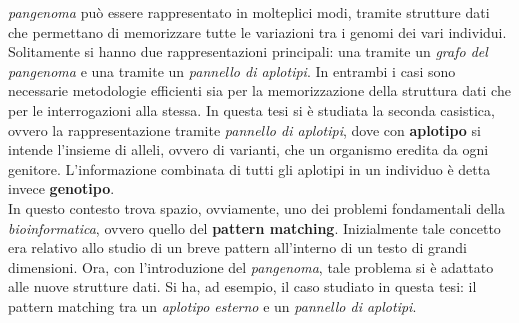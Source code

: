 \documentclass[a4paper,11pt, oneside]{article}
\begin{document}
\textit{pangenoma} può essere rappresentato in molteplici modi, tramite
strutture dati che permettano di memorizzare tutte le variazioni tra i genomi
dei vari individui. Solitamente si hanno due rappresentazioni principali: una
tramite un \textit{grafo del pangenoma} e una tramite un \textit{pannello di
  aplotipi}. In entrambi i casi sono necessarie metodologie efficienti sia per
la memorizzazione della struttura dati che per le interrogazioni alla stessa. In
questa tesi si è studiata la seconda casistica, ovvero la rappresentazione
tramite \textit{pannello di aplotipi}, dove con \textbf{aplotipo} si intende
l'insieme di alleli, ovvero di varianti, che un organismo eredita da ogni
genitore. L'informazione combinata di tutti gli aplotipi in un individuo è detta
invece \textbf{genotipo}.\\
In questo contesto trova spazio, ovviamente, uno dei problemi fondamentali
della \textit{bioinformatica}, ovvero quello del \textbf{pattern
  matching}. Inizialmente tale concetto era relativo allo studio di un breve
pattern all'interno di un testo di grandi dimensioni. Ora, con l'introduzione
del \textit{pangenoma}, tale problema si è adattato alle nuove strutture
dati. Si ha, ad esempio, il caso studiato in questa tesi: il pattern matching
tra un \textit{aplotipo esterno} e un \textit{pannello di aplotipi}.
\end{document}
